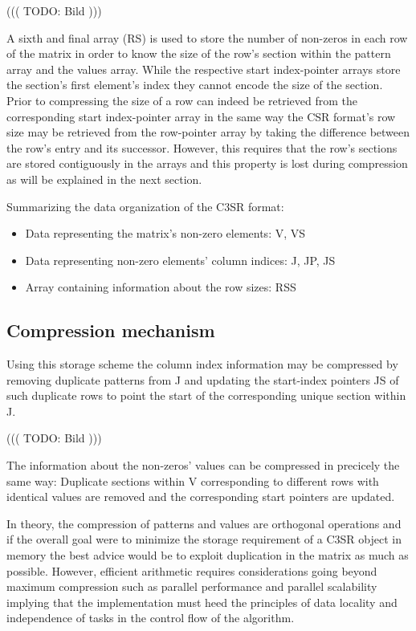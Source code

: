 \documentclass{article}
\begin{document}
      ((( TODO: Bild )))

    A sixth and final array (RS) is used to store the number of non-zeros in each row of the matrix in order to know the
    size of the row's section within the pattern array and the values array. While the respective start index-pointer
    arrays store the section's first element's index they cannot encode the size of the section. Prior to compressing
    the size of a row can indeed be retrieved from the corresponding start index-pointer array in the same way the CSR
    format's row size may be retrieved from the row-pointer array by taking the difference between the row's entry and
    its successor. However, this requires that the row's sections are stored contiguously in the arrays and this
    property is lost during compression as will be explained in the next section.

    Summarizing the data organization of the C3SR format:
    \begin{itemize}
      \item Data representing the matrix's non-zero elements: V, VS
      \item Data representing non-zero elements' column indices: J, JP, JS
      \item Array containing information about the row sizes: RSS
    \end{itemize}

  \subsection{Compression mechanism}

    Using this storage scheme the column index information may be compressed by removing duplicate patterns from J and
    updating the start-index pointers JS of such duplicate rows to point the start of the corresponding unique section
    within J.

      ((( TODO: Bild )))

    The information about the non-zeros' values can be compressed in precicely the same way: Duplicate sections within V
    corresponding to different rows with identical values are removed and the corresponding start pointers are updated.

    In theory, the compression of patterns and values are orthogonal operations and if the overall goal were to minimize
    the storage requirement of a C3SR object in memory the best advice would be to exploit duplication in the matrix as
    much as possible. However, efficient arithmetic requires considerations going beyond maximum compression such as
    parallel performance and parallel scalability implying that the implementation must heed the principles of
    data locality and independence of tasks in the control flow of the algorithm.
\end{document}
